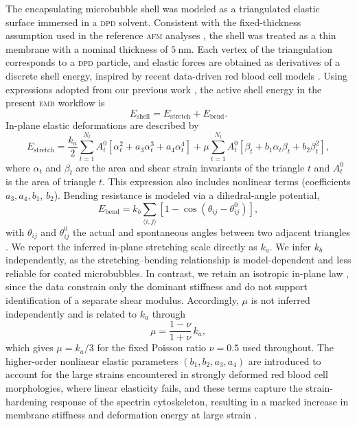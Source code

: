 \documentclass[%
 aip,
 jcp,
 amsmath,amssymb,
 preprint,%
]{revtex4-1}
\begin{document}
The encapsulating microbubble shell was modeled as a triangulated elastic surface immersed in a \textsc{dpd} solvent. Consistent with the fixed-thickness assumption used in the reference \textsc{afm} analyses \cite{buchner2012,morris2014mechanical}, the shell was treated as a thin membrane with a nominal thickness of $5~\mathrm{nm}$. Each vertex of the triangulation corresponds to a \textsc{dpd} particle, and elastic forces are obtained as derivatives of a discrete shell energy, inspired by recent data-driven red blood cell models \cite{walchli2020load,economides2021hierarchical,amoudruz2022simulations,amoudruz2023stress,amoudruz2024volume,amoudruz2025scalable}. Using expressions adopted from our previous work \cite{ntarakas2025dissipative}, the active shell energy in the present \textsc{emb} workflow is
\begin{equation}
E_{\mathrm{shell}} = E_{\mathrm{stretch}} + E_{\mathrm{bend}}.
\end{equation}
In-plane elastic deformations are described by
\begin{equation} \label{stretch_ene}
  E_{\mathrm{stretch}} = \frac{k_a}{2} \sum_{t=1}^{N_t} A_t^0[\alpha_t^2 + a_3 \alpha_t^3 + a_4 \alpha_t^4] + \mu \sum_{t=1}^{N_t} A_t^0[\beta_t + b_1 \alpha_t \beta_t + b_2 \beta_t^2],
\end{equation}
where $\alpha_t$ and $\beta_t$ are the area and shear strain invariants of the triangle $t$ and $A_t^0$ is the area of triangle $t$. This expression also includes nonlinear terms (coefficients $a_3, a_4, b_1$, $b_2$). Bending resistance is modeled via a dihedral-angle potential,
\begin{equation} \label{bend_ene}
  E_{\mathrm{bend}} = k_b\sum_{\langle i,j\rangle} \left[1-\cos(\theta_{ij}-\theta_{ij}^0)\right],
\end{equation}
with $\theta_{ij}$ and $\theta_{ij}^0$ the actual and spontaneous angles between two adjacent triangles \cite{bian2020bending}. We report the inferred in-plane stretching scale directly as $k_a$. We infer $k_b$ independently, as the stretching--bending relationship is model-dependent and less reliable for coated microbubbles. In contrast, we retain an isotropic in-plane law \cite{lim2002stomatocyte,Lim_H_W2009-hl}, since the data constrain only the dominant stiffness and do not support identification of a separate shear modulus. Accordingly, $\mu$ is not inferred independently and is related to $k_a$ through 
\begin{equation}
\mu = \frac{1-\nu}{1+\nu}\,k_a,
\end{equation}
which gives $\mu = k_a/3$ for the fixed Poisson ratio $\nu=0.5$ used throughout. The higher-order nonlinear elastic parameters $(b_1, b_2, a_3, a_4)$ are introduced to account for the large strains encountered in strongly deformed red blood cell morphologies, where linear elasticity fails, and these terms capture the strain-hardening response of the spectrin cytoskeleton, resulting in a marked increase in membrane stiffness and deformation energy at large strain \cite{lim2002stomatocyte,Lim_H_W2009-hl,bozic2012role}.
\end{document}
